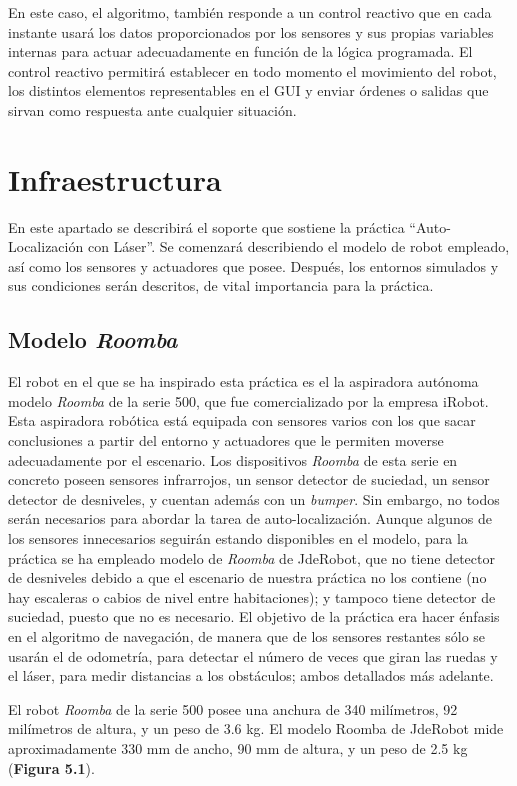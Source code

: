 En este caso, el algoritmo, también responde a un control reactivo que en cada instante usará  los datos proporcionados por los sensores y sus propias variables internas para actuar adecuadamente en función de la lógica programada. El control reactivo permitirá establecer en todo momento el movimiento del robot, los distintos elementos representables en el GUI y enviar órdenes o salidas que sirvan como respuesta ante cualquier situación.

\section{Infraestructura}
En este apartado se describirá el soporte que sostiene la práctica “Auto-Localización con Láser”. Se comenzará describiendo el modelo de robot empleado, así como los sensores y actuadores que posee. Después, los entornos simulados y sus condiciones serán descritos, de vital importancia para la práctica.

\subsection{Modelo \textit{Roomba}}
El robot en el que se ha inspirado esta práctica es el la aspiradora autónoma modelo \textit{Roomba} de la serie 500, que fue comercializado por la empresa iRobot. Esta aspiradora robótica está equipada con sensores varios con los que sacar conclusiones a partir del entorno y actuadores que le permiten moverse adecuadamente por el escenario. Los dispositivos \textit{Roomba} de esta serie en concreto poseen sensores infrarrojos, un sensor detector de suciedad, un sensor detector de desniveles, y cuentan además con un \textit{bumper}. Sin embargo, no todos serán necesarios para abordar la tarea de auto-localización. Aunque algunos de los sensores  innecesarios seguirán estando disponibles en el modelo, para la práctica se ha empleado modelo de \textit{Roomba} de JdeRobot, que no tiene detector de desniveles debido a que el escenario de nuestra práctica no los contiene (no hay escaleras o cabios de nivel entre habitaciones); y tampoco tiene detector de suciedad, puesto que no es necesario. El objetivo de la práctica era hacer énfasis en el algoritmo de navegación, de manera que de los sensores restantes sólo se usarán el de odometría, para detectar el número de veces que giran las ruedas y el láser, para medir distancias a los obstáculos; ambos detallados más adelante. 

El robot \textit{Roomba} de la serie 500 posee una anchura de 340 milímetros, 92 milímetros de altura, y un peso de 3.6 kg. El modelo Roomba de JdeRobot mide aproximadamente 330 mm de ancho, 90 mm de altura, y un peso de 2.5 kg (\textbf{Figura 5.1}).

